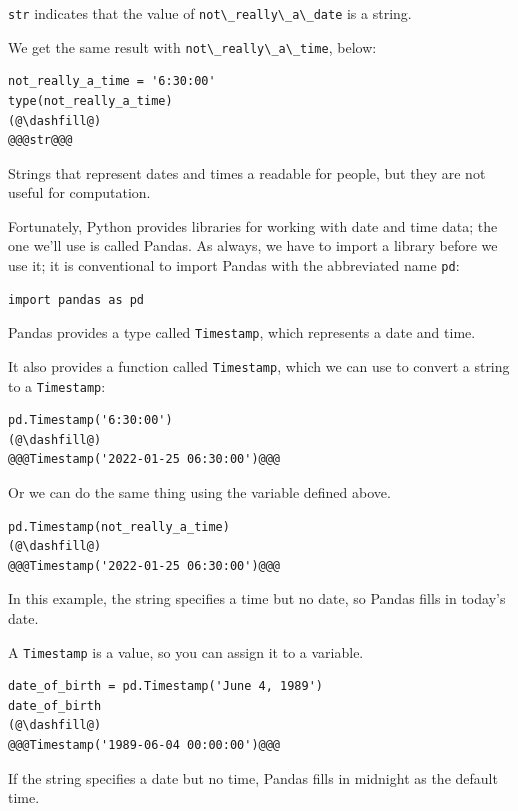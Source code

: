 \passthrough{\lstinline!str!} indicates that the value of
\passthrough{\lstinline!not\_really\_a\_date!} is a string.

We get the same result with
\passthrough{\lstinline!not\_really\_a\_time!}, below:

\begin{lstlisting}[]
not_really_a_time = '6:30:00'
type(not_really_a_time)
(@\dashfill@)
@@@str@@@
\end{lstlisting}

Strings that represent dates and times a readable for people, but they
are not useful for computation.

Fortunately, Python provides libraries for working with date and time
data; the one we'll use is called Pandas. As always, we have to import a
library before we use it; it is conventional to import Pandas with the
abbreviated name \passthrough{\lstinline!pd!}:

\begin{lstlisting}[]
import pandas as pd
\end{lstlisting}

Pandas provides a type called \passthrough{\lstinline!Timestamp!}, which
represents a date and time.

It also provides a function called \passthrough{\lstinline!Timestamp!},
which we can use to convert a string to a
\passthrough{\lstinline!Timestamp!}:

\begin{lstlisting}[]
pd.Timestamp('6:30:00')
(@\dashfill@)
@@@Timestamp('2022-01-25 06:30:00')@@@
\end{lstlisting}

Or we can do the same thing using the variable defined above.

\begin{lstlisting}[]
pd.Timestamp(not_really_a_time)
(@\dashfill@)
@@@Timestamp('2022-01-25 06:30:00')@@@
\end{lstlisting}

In this example, the string specifies a time but no date, so Pandas
fills in today's date.

A \passthrough{\lstinline!Timestamp!} is a value, so you can assign it
to a variable.

\begin{lstlisting}[]
date_of_birth = pd.Timestamp('June 4, 1989')
date_of_birth
(@\dashfill@)
@@@Timestamp('1989-06-04 00:00:00')@@@
\end{lstlisting}

If the string specifies a date but no time, Pandas fills in midnight as
the default time.

